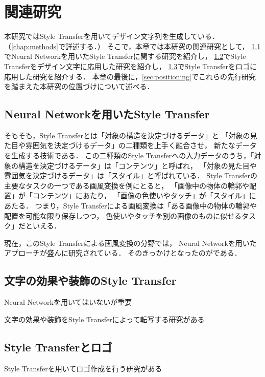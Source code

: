 \documentclass[\homedir/main.tex]{subfiles}
\begin{document}
\setcounter{chapter}{1}
\chapter{関連研究}\label{chap:related_works}
本研究ではStyle Transferを用いてデザイン文字列を生成している．（\cref{chap:methods}で詳述する．）
そこで，本章では本研究の関連研究として，
\cref{sec:neural_style_transfer}でNeural Networkを用いたStyle Transferに関する研究を紹介し，
\cref{sec:text_effects_transfer}でStyle Transferをデザイン文字に応用した研究を紹介し，
\cref{sec:logo_style_transfer}でStyle Transferをロゴに応用した研究を紹介する．
本章の最後に，\cref{sec:positioning}でこれらの先行研究を踏まえた本研究の位置づけについて述べる．

\section{Neural Networkを用いたStyle Transfer}\label{sec:neural_style_transfer}
そもそも，Style Transferとは「対象の構造を決定づけるデータ」と
「対象の見た目や雰囲気を決定づけるデータ」の二種類を上手く融合させ，
新たなデータを生成する技術である．
この二種類のStyle Transferへの入力データのうち，「対象の構造を決定づけるデータ」は「コンテンツ」と呼ばれ，
「対象の見た目や雰囲気を決定づけるデータ」は「スタイル」と呼ばれている．
Style Transferの主要なタスクの一つである画風変換を例にとると，
「画像中の物体の輪郭や配置」が「コンテンツ」にあたり，
「画像の色使いやタッチ」が「スタイル」にあたる．
つまり，Style Transferによる画風変換は「ある画像中の物体の輪郭や配置を可能な限り保存しつつ，
色使いやタッチを別の画像のものに似せるタスク」だといえる．

現在，このStyle Transferによる画風変換の分野では，
Neural Networkを用いたアプローチが盛んに研究されている．
そのきっかけとなったのが\cite{Gatys_2016_CVPR}である．


\section{文字の効果や装飾のStyle Transfer}\label{sec:text_effects_transfer}
Neural Networkを用いてはいないが重要
\cite{Yang_2017_CVPR}

文字の効果や装飾をStyle Transferによって転写する研究がある
\cite{Yang2019Controllable}
\cite{typography2019}
\cite{Yang2019TETGAN}

\section{Style Transferとロゴ}\label{sec:logo_style_transfer}
Style Transferを用いてロゴ作成を行う研究がある
\end{document}
